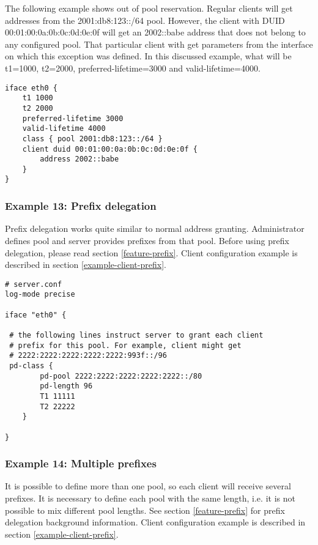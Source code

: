The following example shows out of pool reservation. Regular clients
will get addresses from the 2001:db8:123::/64 pool. However, the
client with DUID 00:01:00:0a:0b:0c:0d:0e:0f will get an 2002::babe
address that does not belong to any configured pool. That particular
client with get parameters from the interface on which this
exception was defined. In this discussed example, what will be
t1=1000, t2=2000, preferred-lifetime=3000 and valid-lifetime=4000.

\begin{lstlisting}
iface eth0 {
    t1 1000
    t2 2000
    preferred-lifetime 3000
    valid-lifetime 4000
    class { pool 2001:db8:123::/64 }
    client duid 00:01:00:0a:0b:0c:0d:0e:0f {
        address 2002::babe
    }
}
\end{lstlisting}

\subsubsection{Example 13: Prefix delegation}
\label{example-server-prefix}

Prefix delegation works quite similar to normal address granting.
Administrator defines pool and server provides prefixes from that
pool. Before using prefix delegation, please read section
\ref{feature-prefix}. Client configuration example is described in section
\ref{example-client-prefix}.

\begin{lstlisting}
# server.conf
log-mode precise

iface "eth0" {

 # the following lines instruct server to grant each client
 # prefix for this pool. For example, client might get
 # 2222:2222:2222:2222:2222:993f::/96
 pd-class {
        pd-pool 2222:2222:2222:2222:2222::/80
        pd-length 96
        T1 11111
        T2 22222
    }

}
\end{lstlisting}

\subsubsection{Example 14: Multiple prefixes}
\label{example-server-prefixes}
It is possible to define more than one pool, so each client will
receive several prefixes. It is necessary to define each pool with the
same length, i.e. it is not possible to mix different pool lengths.
See section \ref{feature-prefix} for prefix delegation background
information. Client configuration example is described in section
\ref{example-client-prefix}.

